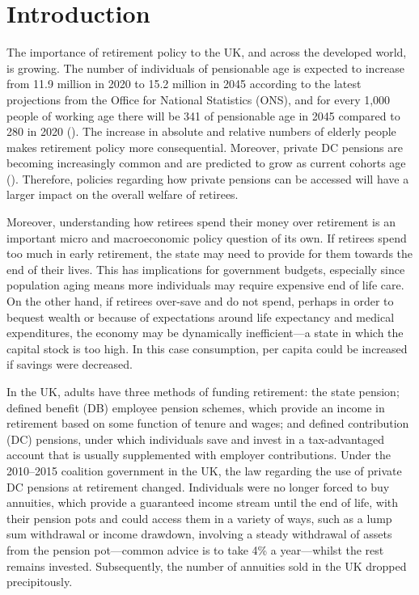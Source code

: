 \documentclass[12pt]{article}
\begin{document}
\section{Introduction}

The importance of retirement policy to the UK, and across the developed world, is growing.
The number of individuals of pensionable age is expected to increase from 11.9 million in 2020 to 15.2 million in 2045 according to the latest projections from the Office for National Statistics (ONS), and for every 1,000 people of working age there will be 341 of pensionable age in 2045 compared to 280 in 2020 (\cite{ons-population-predictions-2020}).
The increase in absolute and relative numbers of elderly people makes retirement policy more consequential.
Moreover, private DC pensions are becoming increasingly common and are predicted to grow
as current cohorts age (\cite{cribb-karjalainen-ifs-2023}).
Therefore, policies regarding how private pensions can be accessed will have a larger impact on the overall welfare of retirees.

Moreover, understanding how retirees spend their money over retirement is an important micro and macroeconomic policy question of its own.
If retirees spend too much in early retirement, the state may need to provide for them towards the end of their lives.
This has implications for government budgets, especially since population aging means more individuals may require expensive end of life care.
On the other hand, if retirees over-save and do not spend, perhaps in order to bequest wealth or because of expectations around life expectancy and medical expenditures, the economy may be dynamically inefficient---a state in which the capital stock is too high.
In this case consumption, per capita could be increased if savings were decreased.

In the UK, adults have three methods of funding retirement: the state pension; defined benefit (DB) employee pension schemes, which provide an income in retirement based on some function of tenure and wages; and defined contribution (DC) pensions, under which individuals save and invest in a tax-advantaged account that is usually supplemented with employer contributions.
Under the 2010--2015 coalition government in the UK, the law regarding the use of private DC pensions at retirement changed.
Individuals were no longer forced to buy annuities, which provide a guaranteed income stream until the end of life, with their pension pots and could access them in a variety of ways, such as a lump sum withdrawal or income drawdown, involving a steady withdrawal of assets from the pension pot---common advice is to take 4\% a year---whilst the rest remains invested.
Subsequently, the number of annuities sold in the UK dropped precipitously.
\end{document}
